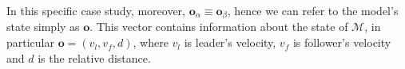 In this specific case study, moreover, $\textbf{o}_\alpha \equiv \textbf{o}_\beta$, hence we can refer to the model's state simply as $\textbf{o}$.
This vector contains information about the state of $\mathcal{M}$, in particular $\textbf{o} = (v_l, v_f, d)$, where $v_l$ is leader's velocity, $v_f$ is follower's velocity and $d$ is the relative distance.